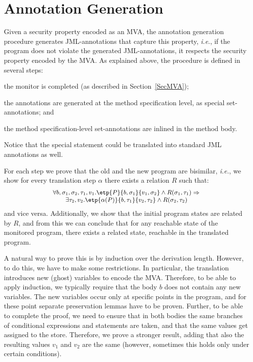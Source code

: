 \section{Annotation Generation}\label{SecAnnotGen}

Given a security property encoded as an MVA, the annotation generation
procedure generates JML-annotations that capture this property,
\emph{i.e.}, if the program does not violate the generated %
JML-annotations, it respects the security property encoded by the
MVA. As explained above, the procedure is defined in several steps:
\begin{inparaenum}
\item the monitor is completed (as described in Section~\ref{SecMVA});
\item the annotations are generated at the method specification level,
as special set-annotations; and
\item the method specification-level set-annotations are inlined in
the method body.
\end{inparaenum}
Notice that the special \CaseJML statement could be translated into
standard JML annotations as well.

For each step we prove that the old and the new program are bisimilar,
\emph{i.e.}, we show for every translation step
\(\alpha\) there exists a relation \(R\) such that:
\[{\small
\begin{array}{l}
\forall b, \sigma_1, \sigma_2, \tau_1, v_1.
\etp{P}{b,\sigma_1}{v_1, \sigma_2} \wedge
R(\sigma_1, \tau_1) \Rightarrow \\
\qquad
\exists \tau_2, v_2.
\etp{\alpha(P)}{b, \tau_1}{v_2, \tau_2} \wedge
R(\sigma_2, \tau_2)
\end{array}}
\]
and vice versa. Additionally, we show that the initial program states
are related by \(R\), and from this we can conclude that for any
reachable state of the monitored program, there exists a related state,
reachable in the translated program.

A natural way to prove this is by induction over the derivation
length. However, to do this, we have to make some restrictions. In
particular, the translation introduces new (ghost) variables to encode
the MVA. Therefore, to be able to apply induction, we typically
require that the body \(b\) does not contain any new variables. The
new variables occur only at specific points in the program, and for
these point separate preservation lemmas have to be proven. Further,
to be able to complete the proof, we need to ensure that in both
bodies the same branches of conditional expressions and statements are
taken, and that the same values get assigned to the store. Therefore,
we prove a stronger result, adding that also the resulting values
\(v_1\) and \(v_2\) are the same (however, sometimes this holds only
under certain conditions).



